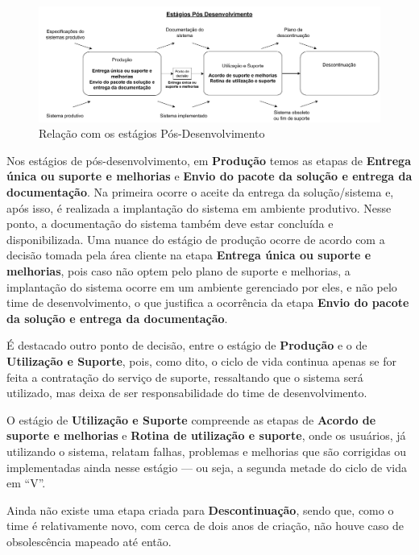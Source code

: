 	\begin{figure}[h]
		\centering
		\includegraphics[width=\textwidth]{./figuras/currentPostDevelopment.pdf}
		\caption{Relação com os estágios Pós-Desenvolvimento}
		\label{fig:metodologia:currentPostDevelopmentPhases}
	\end{figure}

	Nos estágios de pós-desenvolvimento, em \textbf{Produção} temos as etapas de \textbf{Entrega única ou suporte e melhorias} e \textbf{Envio do pacote da solução e entrega da documentação}. Na primeira ocorre o aceite da entrega da solução/sistema e, após isso, é realizada a implantação do sistema em ambiente produtivo.  
	Nesse ponto, a documentação do sistema também deve estar concluída e disponibilizada. Uma nuance do estágio de produção ocorre de acordo com a decisão tomada pela área cliente na etapa \textbf{Entrega única ou suporte e melhorias}, pois caso não optem pelo plano de suporte e melhorias, a implantação do sistema ocorre em um ambiente gerenciado por eles, e não pelo time de desenvolvimento, o que justifica a ocorrência da etapa \textbf{Envio do pacote da solução e entrega da documentação}.

	É destacado outro ponto de decisão, entre o estágio de \textbf{Produção} e o de \textbf{Utilização e Suporte}, pois, como dito, o ciclo de vida continua apenas se for feita a contratação do serviço de suporte, ressaltando que o sistema será utilizado, mas deixa de ser responsabilidade do time de desenvolvimento.

	O estágio de \textbf{Utilização e Suporte} compreende as etapas de \textbf{Acordo de suporte e melhorias} e \textbf{Rotina de utilização e suporte}, onde os usuários, já utilizando o sistema, relatam falhas, problemas e melhorias que são corrigidas ou implementadas ainda nesse estágio — ou seja, a segunda metade do ciclo de vida em ``V''.

	Ainda não existe uma etapa criada para \textbf{Descontinuação}, sendo que, como o time é relativamente novo, com cerca de dois anos de criação, não houve caso de obsolescência mapeado até então.

